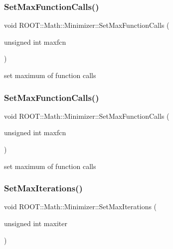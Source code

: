 \subsubsection{\texorpdfstring{SetMaxFunctionCalls()}{SetMaxFunctionCalls()}\hspace{0.1cm}{\footnotesize\ttfamily [1/2]}}
{\footnotesize\ttfamily void R\+O\+O\+T\+::\+Math\+::\+Minimizer\+::\+Set\+Max\+Function\+Calls (\begin{DoxyParamCaption}\item[{unsigned int}]{maxfcn }\end{DoxyParamCaption})\hspace{0.3cm}{\ttfamily [inline]}}



set maximum of function calls 

\mbox{\label{classROOT_1_1Math_1_1Minimizer_aabbadaa76bb5723fcaec0eb7d40850b2}} 
\subsubsection{\texorpdfstring{SetMaxFunctionCalls()}{SetMaxFunctionCalls()}\hspace{0.1cm}{\footnotesize\ttfamily [2/2]}}
{\footnotesize\ttfamily void R\+O\+O\+T\+::\+Math\+::\+Minimizer\+::\+Set\+Max\+Function\+Calls (\begin{DoxyParamCaption}\item[{unsigned int}]{maxfcn }\end{DoxyParamCaption})\hspace{0.3cm}{\ttfamily [inline]}}



set maximum of function calls 

\mbox{\label{classROOT_1_1Math_1_1Minimizer_a1aa272e578cdf2af1b80cc641ce6c58c}} 
\subsubsection{\texorpdfstring{SetMaxIterations()}{SetMaxIterations()}\hspace{0.1cm}{\footnotesize\ttfamily [1/2]}}
{\footnotesize\ttfamily void R\+O\+O\+T\+::\+Math\+::\+Minimizer\+::\+Set\+Max\+Iterations (\begin{DoxyParamCaption}\item[{unsigned int}]{maxiter }\end{DoxyParamCaption})\hspace{0.3cm}{\ttfamily [inline]}}



